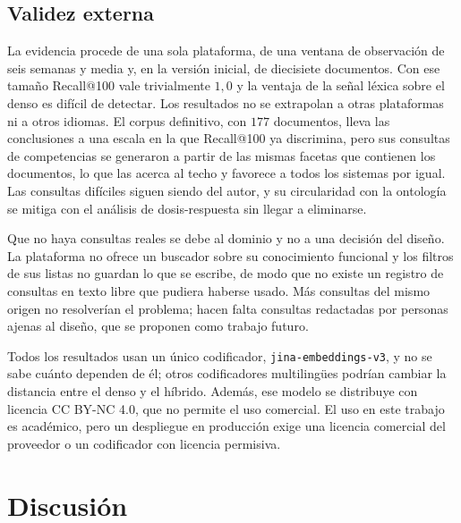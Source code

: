 \documentclass[11pt,letterpaper]{article}
\numberwithin{equation}{section}
\begin{document}
\subsection{Validez externa}
La evidencia procede de una sola plataforma, de una ventana de observación de seis semanas y media y, en la versión inicial, de diecisiete documentos. Con ese tamaño Recall@100 vale trivialmente $1{,}0$ y la ventaja de la señal léxica sobre el denso es difícil de detectar. Los resultados no se extrapolan a otras plataformas ni a otros idiomas. El corpus definitivo, con $177$ documentos, lleva las conclusiones a una escala en la que Recall@100 ya discrimina, pero sus consultas de competencias se generaron a partir de las mismas facetas que contienen los documentos, lo que las acerca al techo y favorece a todos los sistemas por igual. Las consultas difíciles siguen siendo del autor, y su circularidad con la ontología se mitiga con el análisis de dosis-respuesta sin llegar a eliminarse.

Que no haya consultas reales se debe al dominio y no a una decisión del diseño. La plataforma no ofrece un buscador sobre su conocimiento funcional y los filtros de sus listas no guardan lo que se escribe, de modo que no existe un registro de consultas en texto libre que pudiera haberse usado. Más consultas del mismo origen no resolverían el problema; hacen falta consultas redactadas por personas ajenas al diseño, que se proponen como trabajo futuro.

Todos los resultados usan un único codificador, \texttt{jina-embeddings-v3}, y no se sabe cuánto dependen de él; otros codificadores multilingües podrían cambiar la distancia entre el denso y el híbrido. Además, ese modelo se distribuye con licencia CC BY-NC 4.0, que no permite el uso comercial. El uso en este trabajo es académico, pero un despliegue en producción exige una licencia comercial del proveedor o un codificador con licencia permisiva.

\section{Discusión}
\label{sec:discusion}
\end{document}
